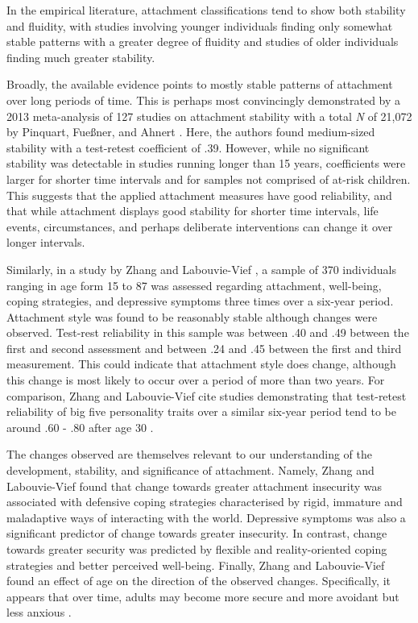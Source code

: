\documentclass[12pt]{report}
\begin{document}
In the empirical literature, attachment classifications tend to show both stability and fluidity, with studies involving younger individuals finding only somewhat stable patterns with a greater degree of fluidity and studies of older individuals finding much greater stability.

Broadly, the available evidence points to mostly stable patterns of attachment over long periods of time. This is perhaps most convincingly demonstrated by a 2013 meta-analysis of 127 studies on attachment stability with a total \textit{N} of 21,072 by Pinquart, Fueßner, and Ahnert \citeyear{Pinquart2013}.
Here, the authors found medium-sized stability with a test-retest coefficient of .39. However, while no significant stability was detectable in studies running longer than 15 years, coefficients were larger for shorter time intervals and for samples not comprised of at-risk children.
This suggests that the applied attachment measures have good reliability, and that while attachment displays good stability for shorter time intervals, life events, circumstances, and perhaps deliberate interventions can change it over longer intervals.

Similarly, in a study by Zhang and Labouvie-Vief \citeyear{Zhang2004}, a sample of 370 individuals ranging in age form 15 to 87 was assessed regarding attachment, well-being, coping strategies, and depressive symptoms three times over a six-year period. Attachment style was found to be reasonably stable although changes were observed.
Test-rest reliability in this sample was between .40 and .49 between the first and second assessment and between .24 and .45 between the first and third measurement. This could indicate that attachment style does change, although this change is most likely to occur over a period of more than two years.
For comparison, Zhang and Labouvie-Vief cite studies demonstrating that test-retest reliability of big five personality traits over a similar six-year period tend to be around .60 - .80 after age 30 \cite{Costa1988,Roberts2000}.

The changes observed are themselves relevant to our understanding of the development, stability, and significance of attachment.
Namely, Zhang and Labouvie-Vief \citeyear{Zhang2004} found that change towards greater attachment insecurity was associated with defensive coping strategies characterised by rigid, immature and maladaptive ways of interacting with the world.
Depressive symptoms was also a significant predictor of change towards greater insecurity.
In contrast, change towards greater security was predicted by flexible and reality-oriented coping strategies and better perceived well-being.
Finally, Zhang and Labouvie-Vief found an effect of age on the direction of the observed changes. Specifically, it appears that over time, adults may become more secure and more avoidant but less anxious  \cite{Zhang2004}.
\end{document}
